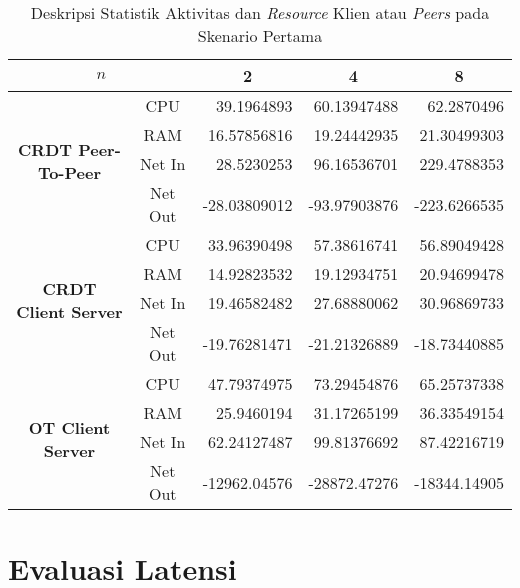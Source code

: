 \begin{table}[H]
 \centering
 \caption{Deskripsi Statistik Aktivitas dan \textit{Resource} Klien atau \textit{Peers} pada Skenario Pertama}

\begin{tabular}{|cc|r|r|r|}
\hline
\multicolumn{2}{|c|}{$n$} & \multicolumn{1}{c|}{\textbf{2}} & \multicolumn{1}{c|}{\textbf{4}} & \multicolumn{1}{c|}{\textbf{8}} \\ \hline
\multicolumn{1}{|c|}{\multirow{4}{*}{\textbf{CRDT Peer-To-Peer}}} & CPU & 39.1964893 & 60.13947488 & 62.2870496 \\ \cline{2-5}
\multicolumn{1}{|c|}{} & RAM & 16.57856816 & 19.24442935 & 21.30499303 \\ \cline{2-5}
\multicolumn{1}{|c|}{} & Net In & 28.5230253 & 96.16536701 & 229.4788353 \\ \cline{2-5}
\multicolumn{1}{|c|}{} & Net Out & -28.03809012 & -93.97903876 & -223.6266535 \\ \hline
\multicolumn{1}{|c|}{\multirow{4}{*}{\textbf{CRDT Client Server}}} & CPU & 33.96390498 & 57.38616741 & 56.89049428 \\ \cline{2-5}
\multicolumn{1}{|c|}{} & RAM & 14.92823532 & 19.12934751 & 20.94699478 \\ \cline{2-5}
\multicolumn{1}{|c|}{} & Net In & 19.46582482 & 27.68880062 & 30.96869733 \\ \cline{2-5}
\multicolumn{1}{|c|}{} & Net Out & -19.76281471 & -21.21326889 & -18.73440885 \\ \hline
\multicolumn{1}{|c|}{\multirow{4}{*}{\textbf{OT Client Server}}} & CPU & 47.79374975 & 73.29454876 & 65.25737338 \\ \cline{2-5}
\multicolumn{1}{|c|}{} & RAM & 25.9460194 & 31.17265199 & 36.33549154 \\ \cline{2-5}
\multicolumn{1}{|c|}{} & Net In & 62.24127487 & 99.81376692 & 87.42216719 \\ \cline{2-5}
\multicolumn{1}{|c|}{} & Net Out & -12962.04576 & -28872.47276 & -18344.14905 \\ \hline
\end{tabular}
\end{table}

\section{Evaluasi Latensi}

